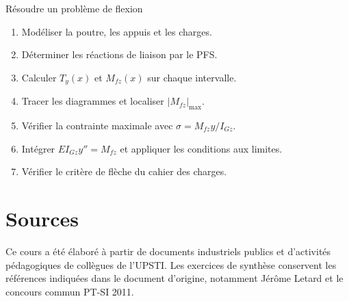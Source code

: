 \begin{TLMethod}{Résoudre un problème de flexion}
\begin{enumerate}
  \item Modéliser la poutre, les appuis et les charges.
  \item Déterminer les réactions de liaison par le PFS.
  \item Calculer $T_y(x)$ et $M_{fz}(x)$ sur chaque intervalle.
  \item Tracer les diagrammes et localiser $|M_{fz}|_{\max}$.
  \item Vérifier la contrainte maximale avec $\sigma=M_{fz}y/I_{Gz}$.
  \item Intégrer $EI_{Gz}y''=M_{fz}$ et appliquer les conditions aux limites.
  \item Vérifier le critère de flèche du cahier des charges.
\end{enumerate}
\end{TLMethod}

\section{Sources}
\label{sec:rdm-7}

Ce cours a été élaboré à partir de documents industriels publics et d'activités pédagogiques de collègues de l'UPSTI. Les exercices de synthèse conservent les références indiquées dans le document d'origine, notamment Jérôme Letard et le concours commun PT-SI 2011.
